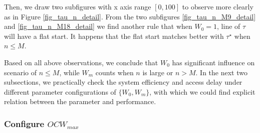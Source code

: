 \documentclass[journal]{IEEEtran}
\begin{document}
Then, we draw two subfigures with x axis range $[0,100]$ to observe more clearly as in Figure \ref{fig_tau_n_detail}. 
From the two subfigures \ref{fig_tau_n_M9_detail} and \ref{fig_tau_n_M18_detail} we find another rule that when $W_0=1$, line of $\tau$ will have a flat start.
It happens that the flat start matches better with $\tau^\star$ when $n\leq M$.

Based on all above observations, we conclude that $W_0$ has significant influence on scenario of $n\leq M$, while $W_m$ counts when $n$ is large or $n>M$. 
In the next two subsections, we practically check the system efficiency and access delay under different parameter configurations of $\lbrace W_0, W_m \rbrace$, with which we could find explicit relation between the parameter and performance.




\subsubsection{Configure $OCW_{max}$}
\end{document}
